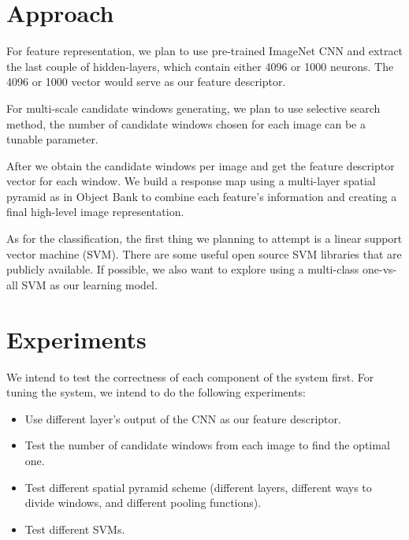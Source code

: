 \documentclass[letterpaper,twocolumn,10pt]{article}
\begin{document}
\section{Approach}
\par
    For feature representation, we plan to use pre-trained ImageNet CNN and
    extract the last couple of hidden-layers, which contain either 4096 or
    1000 neurons. The 4096 or 1000 vector would serve as our feature
    descriptor.

\par
    For multi-scale candidate windows generating, we plan to use selective
    search method, the number of candidate windows chosen for each image can be
    a tunable parameter.

\par
    After we obtain the candidate windows per image and get the feature
    descriptor vector for each window. We build a response map using
    a multi-layer spatial pyramid as in Object Bank to combine each feature's
    information and creating a final high-level image representation.

\par
    As for the classification, the first thing we planning to attempt is
    a linear support vector machine (SVM). There are some useful open source
    SVM libraries that are publicly available.  If possible, we also want to
    explore using a multi-class one-vs-all SVM as our learning model.

\section{Experiments}
We intend to test the correctness of each component of the system first.
For tuning the system, we intend to do the following experiments:
\begin{itemize}
\item Use different layer's output of the CNN as our feature descriptor.
\item Test the number of candidate windows from each image to find the optimal one.
\item Test different spatial pyramid scheme (different layers, different ways to divide windows, and different pooling functions).
\item Test different SVMs.
\end{itemize}
\end{document}
